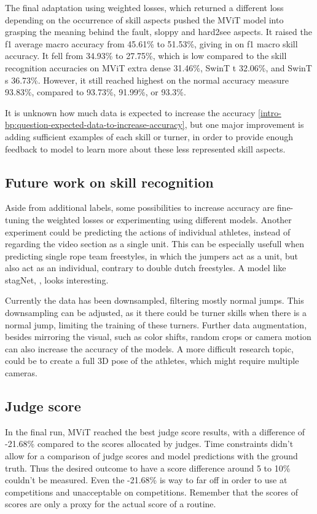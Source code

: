 The final adaptation using weighted losses, which returned a different loss depending on the occurrence of skill aspects pushed the MViT model into grasping the meaning behind the fault, sloppy and hard2see aspects. It raised the f1 average macro accuracy from 45.61\% to 51.53\%, giving in on f1 macro skill accuracy. It fell from 34.93\% to 27.75\%, which is low compared to the skill recognition accuracies on MViT extra dense 31.46\%, SwinT t 32.06\%, and SwinT s 36.73\%. However, it still reached highest on the normal accuracy measure 93.83\%, compared to 93.73\%, 91.99\%, or 93.3\%.

It is unknown how much data is expected to increase the accuracy \ref{intro-bp:question-expected-data-to-increase-accuracy}, but one major improvement is adding sufficient examples of each skill or turner, in order to provide enough feedback to model to learn more about these less represented skill aspects.

\subsection{Future work on skill recognition}

Aside from additional labels, some possibilities to increase accuracy are fine-tuning the weighted losses or experimenting using different models. Another experiment could be predicting the actions of individual athletes, instead of regarding the video section as a single unit. This can be especially usefull when predicting single rope team freestyles, in which the jumpers act as a unit, but also act as an individual, contrary to double dutch freestyles. A model like stagNet, \autocite{Qi_2020}, looks interesting.

Currently the data has been downsampled, filtering mostly normal jumps. This downsampling can be adjusted, as it there could be turner skills when there is a normal jump, limiting the training of these turners. Further data augmentation, besides mirroring the visual, such as color shifts, random crops or camera motion can also increase the accuracy of the models. A more difficult research topic, could be to create a full 3D pose of the athletes, which might require multiple cameras.


\subsection{Judge score}

In the final run, MViT reached the best judge score results, with a difference of -21.68\% compared to the scores allocated by judges.
Time constraints didn't allow for a comparison of judge scores and model predictions with the ground truth. Thus the desired outcome to have a score difference around 5 to 10\% couldn't be measured. Even the -21.68\% is way to far off in order to use at competitions and unacceptable on competitions.
Remember that the scores of scores are only a proxy for the actual score of a routine.

